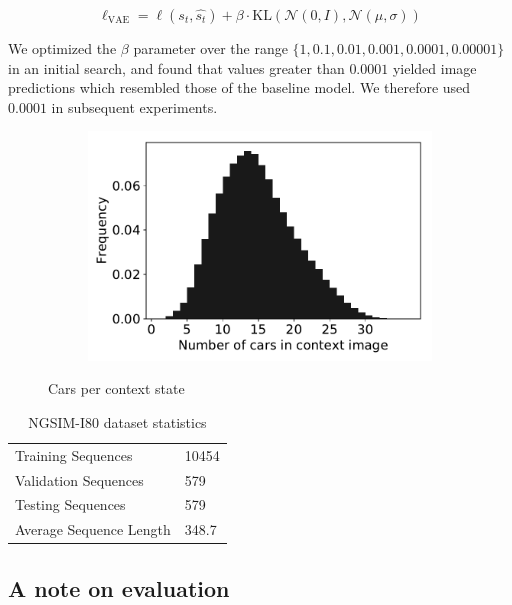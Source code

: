 \documentclass{article}
\begin{document}
\begin{equation}
  \ell_{\text{VAE}} = \ell(s_t, \hat{s_t}) + \beta \cdot \mbox{KL}(\mathcal{N}(0, I), \mathcal{N}(\mu, \sigma))
\end{equation}

We optimized the $\beta$ parameter over the range $\{1, 0.1, 0.01, 0.001, 0.0001, 0.00001 \}$ in an initial search, and found that values greater than $0.0001$ yielded image predictions which resembled those of the baseline model.
We therefore used $0.0001$ in subsequent experiments.


\begin{figure}
  \centering
  \begin{subfigure}[b]{0.5\textwidth}
    \includegraphics[width=\textwidth]{images/car_statistics.pdf}
  \end{subfigure}
  \caption{Cars per context state}
  \label{car-statistics}
\end{figure}


\begin{table}
  \caption{NGSIM-I80 dataset statistics}
  \label{i80-stats}
  \centering
  \begin{tabular}{ll}
    \toprule
    Training Sequences     & 10454 \\
    Validation Sequences & 579 \\
    Testing Sequences & 579 \\
    Average Sequence Length & 348.7 \\
    \bottomrule
  \end{tabular}
\end{table}



\subsection{A note on evaluation} \label{proof}
\end{document}
